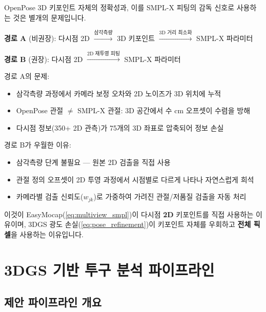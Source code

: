 \documentclass[11pt, a4paper]{report}
\begin{document}
\begin{importantnote}[title={OpenPose 3D가 정확해도 SMPL-X 피팅에 직접 쓰면 안 되는 이유}]
OpenPose 3D 키포인트 자체의 정확성과, 이를 SMPL-X 피팅의 감독 신호로 사용하는 것은 별개의 문제입니다.

\textbf{경로 A} (비권장): 다시점 2D $\xrightarrow{\text{삼각측량}}$ 3D 키포인트 $\xrightarrow{\text{3D 거리 최소화}}$ SMPL-X 파라미터

\textbf{경로 B} (권장): 다시점 2D $\xrightarrow{\text{2D 재투영 피팅}}$ SMPL-X 파라미터

경로 A의 문제:
\begin{itemize}[leftmargin=*]
  \item 삼각측량 과정에서 카메라 보정 오차와 2D 노이즈가 3D 위치에 누적
  \item OpenPose 관절 $\neq$ SMPL-X 관절: 3D 공간에서 수 cm 오프셋이 수렴을 방해
  \item 다시점 정보(350+ 2D 관측)가 75개의 3D 좌표로 압축되어 정보 손실
\end{itemize}

경로 B가 우월한 이유:
\begin{itemize}[leftmargin=*]
  \item 삼각측량 단계 불필요 --- 원본 2D 검출을 직접 사용
  \item 관절 정의 오프셋이 2D 투영 과정에서 시점별로 다르게 나타나 자연스럽게 희석
  \item 카메라별 검출 신뢰도($w_{jk}$)로 가중하여 가려진 관절/저품질 검출을 자동 처리
\end{itemize}

이것이 EasyMocap(\cref{eq:multiview_smpl})이 다시점 \textbf{2D} 키포인트를 직접 사용하는 이유이며,
3DGS 광도 손실(\cref{eq:pose_refinement})이 키포인트 자체를 우회하고 \textbf{전체 픽셀}을
사용하는 이유입니다.
\end{importantnote}


\chapter{3DGS 기반 투구 분석 파이프라인}
\label{ch:3dgs_pitching}

\section{제안 파이프라인 개요}
\end{document}
